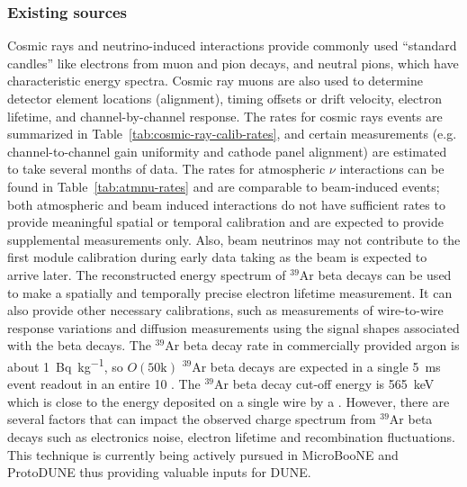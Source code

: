 \subsubsection{Existing sources} 
\label{sec:phys-calib-exis}
Cosmic rays and neutrino-induced interactions provide commonly used ``standard candles'' like electrons from muon and pion decays, and neutral pions, which have characteristic energy spectra. Cosmic ray muons are also used to determine detector element locations (alignment), timing offsets or drift velocity, electron lifetime, and channel-by-channel response. The rates for cosmic rays events are summarized in Table~\ref{tab:cosmic-ray-calib-rates}, and certain measurements (e.g. channel-to-channel gain uniformity and cathode panel alignment) are estimated to take several months of data. The rates for atmospheric $\nu$ interactions can be found in Table~\ref{tab:atmnu-rates}  and are comparable to beam-induced events; both atmospheric and beam induced interactions do not have sufficient rates to provide meaningful spatial or temporal calibration and are expected to provide supplemental measurements only. Also, beam neutrinos may not contribute to the first module calibration during early data taking as the beam is expected to arrive later. The reconstructed energy spectrum of ${}^{39}$Ar beta decays can be used to make a spatially and temporally precise electron lifetime measurement. It can also provide other necessary calibrations, such as measurements of wire-to-wire response variations and diffusion measurements using the signal shapes associated with the beta decays. The ${}^{39}$Ar beta decay rate in commercially provided argon is about \SI{1}{\becquerel\per\kilo\gram}, so $O(\mathrm{50k})$ ${}^{39}$Ar beta decays are expected in a single \SI{5}{\milli\s} event readout in an entire \SI{10}{\kt} \detmodule. The ${}^{39}$Ar beta decay cut-off energy is \SI{565}{\keV} which is close to the energy deposited on a single wire by a . However, there are several factors that can impact the observed charge spectrum from ${}^{39}$Ar beta decays such as electronics noise, electron lifetime and recombination fluctuations. This technique is currently being actively pursued in MicroBooNE  and ProtoDUNE thus providing valuable inputs for DUNE.

